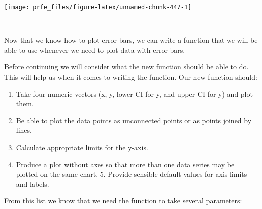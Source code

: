 \documentclass[
  12pt,
  a4paper]{book}
\begin{document}
\begin{center}\texttt{[image: prfe\_files/figure-latex/unnamed-chunk-447-1]} \end{center}

~

Now that we know how to plot error bars, we can write a function that we will be able to use whenever we need to plot data with error bars.

Before continuing we will consider what the new function should be able to do. This will help us when it comes to writing the function. Our new function should:

\begin{enumerate}
\def\labelenumi{\arabic{enumi}.}
\item
  Take four numeric vectors (x, y, lower CI for y, and upper CI for y) and plot them.
\item
  Be able to plot the data points as unconnected points or as points joined by lines.
\item
  Calculate appropriate limits for the y-axis.
\item
  Produce a plot without axes so that more than one data series may be plotted on the same chart. 5. Provide sensible default values for axis limits and labels.
\end{enumerate}

From this list we know that we need the function to take several parameters:

~
\end{document}
